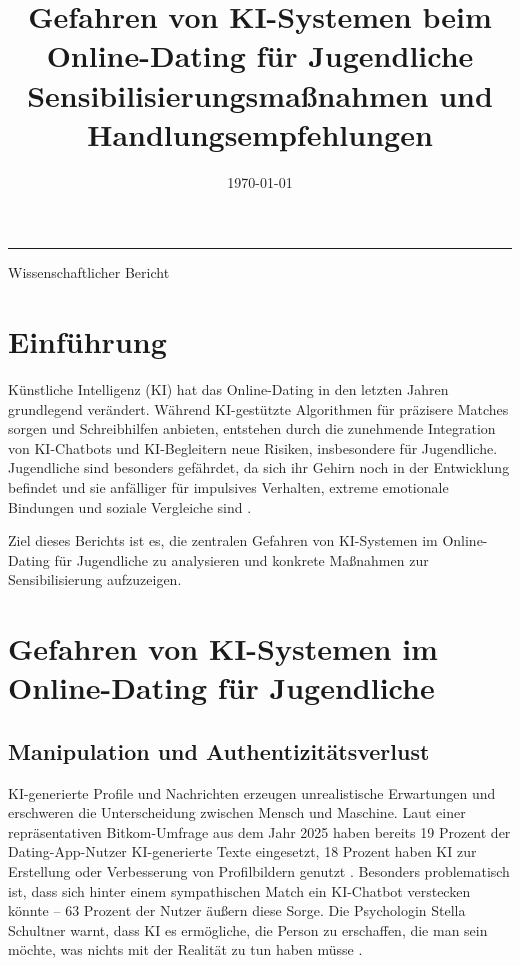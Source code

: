 \documentclass[12pt,a4paper,oneside]{scrartcl}
\title{\textbf{Gefahren von KI-Systemen beim Online-Dating für Jugendliche} \\
	\large Sensibilisierungsmaßnahmen und Handlungsempfehlungen}
\author{}
\date{\today}
\begin{document}
	
	\maketitle
	
	\begin{center}
		\rule{0.9\textwidth}{0.4pt}
		\vspace{0.5cm}
		{\large Wissenschaftlicher Bericht}
	\end{center}
	
	\newpage
	\tableofcontents
	\newpage
	
	\section{Einführung}
	
	Künstliche Intelligenz (KI) hat das Online-Dating in den letzten Jahren grundlegend verändert. Während KI-gestützte Algorithmen für präzisere Matches sorgen und Schreibhilfen anbieten, entstehen durch die zunehmende Integration von KI-Chatbots und KI-Begleitern neue Risiken, insbesondere für Jugendliche. Jugendliche sind besonders gefährdet, da sich ihr Gehirn noch in der Entwicklung befindet und sie anfälliger für impulsives Verhalten, extreme emotionale Bindungen und soziale Vergleiche sind \cite{Stanford2025}.
	
	Ziel dieses Berichts ist es, die zentralen Gefahren von KI-Systemen im Online-Dating für Jugendliche zu analysieren und konkrete Maßnahmen zur Sensibilisierung aufzuzeigen.
	
	\section{Gefahren von KI-Systemen im Online-Dating für Jugendliche}
	
	\subsection{Manipulation und Authentizitätsverlust}
	
	KI-generierte Profile und Nachrichten erzeugen unrealistische Erwartungen und erschweren die Unterscheidung zwischen Mensch und Maschine. Laut einer repräsentativen Bitkom-Umfrage aus dem Jahr 2025 haben bereits 19 Prozent der Dating-App-Nutzer KI-generierte Texte eingesetzt, 18 Prozent haben KI zur Erstellung oder Verbesserung von Profilbildern genutzt \cite{Bitkom2025}. Besonders problematisch ist, dass sich hinter einem sympathischen Match ein KI-Chatbot verstecken könnte – 63 Prozent der Nutzer äußern diese Sorge. Die Psychologin Stella Schultner warnt, dass KI es ermögliche, die Person zu erschaffen, die man sein möchte, was nichts mit der Realität zu tun haben müsse \cite{Sueddeutsche2025}.
	
\end{document}
